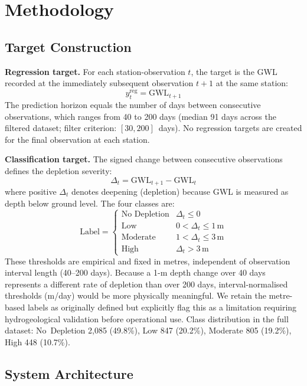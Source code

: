 \documentclass[conference]{IEEEtran}
\begin{document}
\section{Methodology}
\label{sec:method}

\subsection{Target Construction}
\label{sec:target}

\textbf{Regression target.}
For each station-observation $t$, the target is the GWL recorded at
the immediately subsequent observation $t+1$ at the same station:
\[
  y^{\text{reg}}_t = \text{GWL}_{t+1}
\]
The prediction horizon equals the number of days between consecutive
observations, which ranges from 40 to 200 days (median 91 days
across the filtered dataset; filter criterion: $[30, 200]$~days).
No regression targets are created for the final observation at each
station.

\textbf{Classification target.}
The signed change between consecutive observations defines the
depletion severity:
\[
  \Delta_t = \text{GWL}_{t+1} - \text{GWL}_t
\]
where positive $\Delta_t$ denotes deepening (depletion) because GWL
is measured as depth below ground level.
The four classes are:
\[
  \text{Label} = \begin{cases}
    \text{No Depletion} & \Delta_t \leq 0 \\
    \text{Low}          & 0 < \Delta_t \leq 1\,\text{m} \\
    \text{Moderate}     & 1 < \Delta_t \leq 3\,\text{m} \\
    \text{High}         & \Delta_t > 3\,\text{m}
  \end{cases}
\]
These thresholds are empirical and fixed in metres, independent of
observation interval length (40--200 days).
Because a 1-m depth change over 40 days represents a different
rate of depletion than over 200 days, interval-normalised
thresholds (m/day) would be more physically meaningful.
We retain the metre-based labels as originally defined but
explicitly flag this as a limitation requiring hydrogeological
validation before operational use.
Class distribution in the full dataset:
No~Depletion 2,085 (49.8\%), Low 847 (20.2\%),
Moderate 805 (19.2\%), High 448 (10.7\%).

\subsection{System Architecture}
\end{document}
